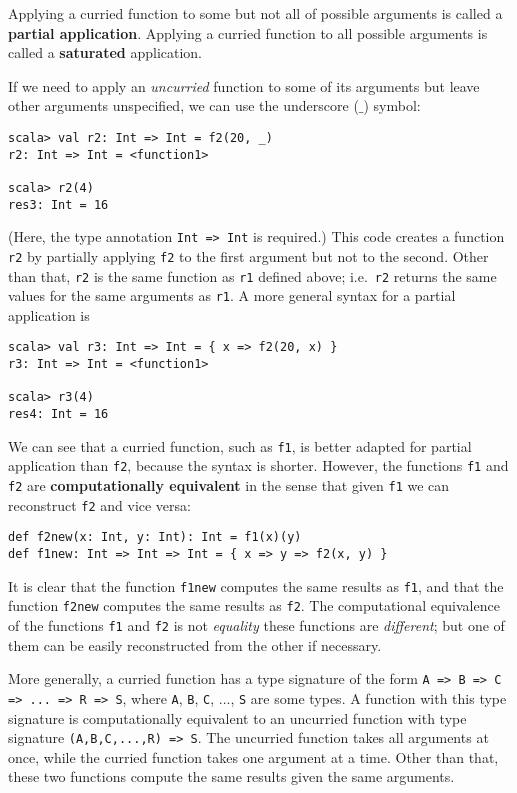 Applying a curried function to some but not all of possible arguments
is called a \textbf{partial application}.
Applying a curried function to all possible arguments is called a
\textbf{saturated} application.

If we need to apply an \emph{uncurried} function to some of its arguments
but leave other arguments unspecified, we can use the underscore ($\_$)
symbol:
\begin{lstlisting}
scala> val r2: Int => Int = f2(20, _)
r2: Int => Int = <function1>

scala> r2(4)
res3: Int = 16
\end{lstlisting}
(Here, the type annotation \lstinline!Int => Int! is required.) This
code creates a function \lstinline!r2! by partially applying \lstinline!f2!
to the first argument but not to the second. Other than that, \lstinline!r2!
is the same function as \lstinline!r1! defined above; i.e.~\lstinline!r2!
returns the same values for the same arguments as \lstinline!r1!.
A more general syntax for a partial application is
\begin{lstlisting}
scala> val r3: Int => Int = { x => f2(20, x) }
r3: Int => Int = <function1>

scala> r3(4)
res4: Int = 16
\end{lstlisting}

We can see that a curried function, such as \lstinline!f1!, is better
adapted for partial application than \lstinline!f2!, because the
syntax is shorter. However, the functions \lstinline!f1! and \lstinline!f2!
are \textbf{computationally equivalent}
in the sense that given \lstinline!f1! we can reconstruct \lstinline!f2!
and vice versa:
\begin{lstlisting}
def f2new(x: Int, y: Int): Int = f1(x)(y)
def f1new: Int => Int => Int = { x => y => f2(x, y) }
\end{lstlisting}
It is clear that the function \lstinline!f1new! computes the same
results as \lstinline!f1!, and that the function \lstinline!f2new!
computes the same results as \lstinline!f2!. The computational equivalence
of the functions \lstinline!f1! and \lstinline!f2! is not \emph{equality}
 \textendash{}  these functions are \emph{different}; but one of them
can be easily reconstructed from the other if necessary. 

More generally, a curried function has a type signature of the form
\lstinline!A => B => C => ... => R => S!, where \lstinline!A!, \lstinline!B!,
\lstinline!C!, ..., \lstinline!S! are some types. A function with
this type signature is computationally equivalent to an uncurried
function with type signature \lstinline!(A,B,C,...,R) => S!. The
uncurried function takes all arguments at once, while the curried
function takes one argument at a time. Other than that, these two
functions compute the same results given the same arguments.

